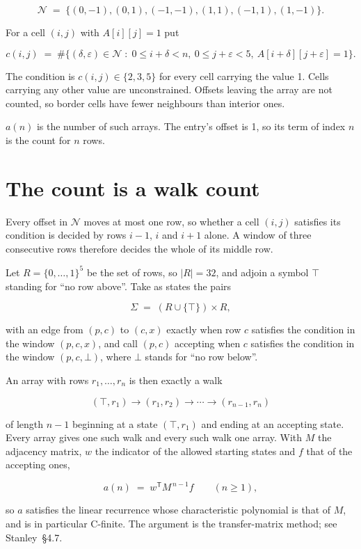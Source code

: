 \documentclass[11pt]{article}
\theoremstyle{definition}
\begin{document}
\[\mathcal{N} \;=\; \{(0,-1), (0,1), (-1,-1), (1,1), (-1,1), (1,-1)\}.\]

For a cell $(i,j)$ with $A[i][j] = 1$ put

\[c(i,j) \;=\; \#\bigl\{(\delta,\varepsilon)\in\mathcal{N} \;:\; 0\le i+\delta<n,\ 0\le j+\varepsilon<5,\ A[i+\delta][j+\varepsilon] = 1\bigr\}.\]

The condition is $c(i,j) \in \{2, 3, 5\}$ for every cell carrying the value 1. Cells carrying any other value are unconstrained. Offsets leaving the array are not counted, so border cells have fewer neighbours than interior ones.

$a(n)$ is the number of such arrays. The entry's offset is 1, so its term of index $n$ is the count for $n$ rows.

\section{The count is a walk count}

Every offset in $\mathcal{N}$ moves at most one row, so whether a cell $(i,j)$ satisfies its condition is decided by rows $i-1$, $i$ and $i+1$ alone. A window of three consecutive rows therefore decides the whole of its middle row.

Let $R = \{0,\dots,1\}^{5}$ be the set of rows, so $|R| = 32$, and adjoin a symbol $\top$ standing for ``no row above''. Take as states the pairs

\[\Sigma \;=\; (R \cup \{\top\}) \times R,\]

with an edge from $(p,c)$ to $(c,x)$ exactly when row $c$ satisfies the condition in the window $(p,c,x)$, and call $(p,c)$ accepting when $c$ satisfies the condition in the window $(p,c,\bot)$, where $\bot$ stands for ``no row below''.

An array with rows $r_1,\dots,r_n$ is then exactly a walk

\[(\top,r_1) \to (r_1,r_2) \to \cdots \to (r_{n-1},r_n)\]

of length $n-1$ beginning at a state $(\top,r_1)$ and ending at an accepting state. Every array gives one such walk and every such walk one array. With $M$ the adjacency matrix, $w$ the indicator of the allowed starting states and $f$ that of the accepting ones,

\[a(n) \;=\; w^{\mathsf T} M^{\,n-1} f \qquad (n \ge 1),\]

so $a$ satisfies the linear recurrence whose characteristic polynomial is that of $M$, and is in particular C-finite. The argument is the transfer-matrix method; see Stanley~\S4.7.
\end{document}
